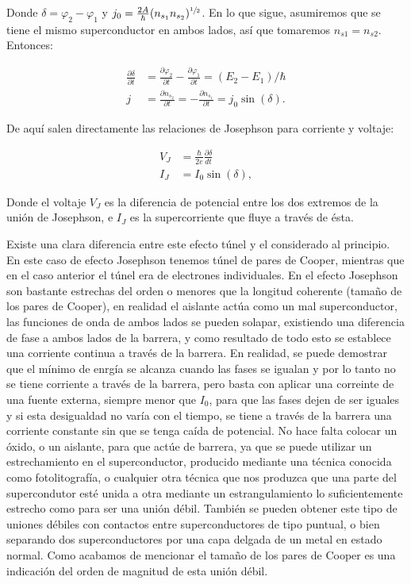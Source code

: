 Donde $\delta = \varphi_2 - \varphi_1$ y $j_0 = \frac{2 A}{\hbar} (n_{s_1} n_{s_2})^{\sfrac{1}{2}}$. En lo que sigue, asumiremos que se tiene el mismo superconductor en ambos lados, así que tomaremos $n_{s1} = n_{s2}$. Entonces:

\begin{align}
    \frac{\partial \delta}{\partial t} &= \frac{\partial \varphi_2}{\partial t} - \frac{\partial \varphi_1}{\partial t} = (E_2 - E_1)/\hbar \\
    j &= \frac{\partial n_{s_2}}{\partial t} = - \frac{\partial n_{s_1}}{\partial t} = j_0 \sin(\delta) .
\end{align}

De aquí salen directamente las relaciones de Josephson para corriente y voltaje:

\begin{align}
    V_J &= \frac{\hbar}{2e} \frac{\partial \delta}{d t} \\
    I_J &= I_0 \sin(\delta) ,
\end{align}

Donde el voltaje $V_J$ es la diferencia de potencial entre los dos extremos de la unión de Josephson, e $I_J$ es la supercorriente que fluye a través de ésta.

Existe una clara diferencia entre este efecto túnel y el considerado al principio. En este caso de efecto Josephson tenemos túnel de pares de Cooper, mientras que en el caso anterior el túnel era de electrones individuales. En el efecto Josephson son bastante estrechas del orden o menores que la longitud coherente (tamaño de los pares de Cooper), en realidad el aislante actúa como un mal superconductor, las funciones de onda de ambos lados se pueden solapar, existiendo una diferencia de fase a ambos lados de la barrera, y como resultado de todo esto se establece una corriente continua a través de la barrera. En realidad, se puede demostrar que el mínimo de enrgía se alcanza cuando las fases se igualan y por lo tanto no se tiene corriente a través de la barrera, pero basta con aplicar una correinte de una fuente externa, siempre menor que $I_0$, para que las fases dejen de ser iguales y si esta desigualdad no varía con el tiempo, se tiene a través de la barrera una corriente constante sin que se tenga caída de potencial. No hace falta colocar un óxido, o un aislante, para que actúe de barrera, ya que se puede utilizar un estrechamiento en el superconductor, producido mediante una técnica conocida como fotolitografía, o cualquier otra técnica que nos produzca que una parte del supercondutor esté unida a otra mediante un estrangulamiento lo suficientemente estrecho como para ser una unión débil. También se pueden obtener este tipo de uniones débiles con contactos entre superconductores de tipo puntual, o bien separando dos superconductores por una capa delgada de un metal en estado normal. Como acabamos de mencionar el tamaño de los pares de Cooper es una indicación del orden de magnitud de esta unión débil.

